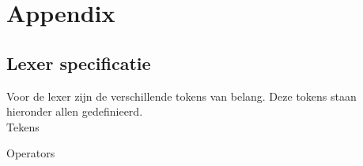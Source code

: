 \chapter{Appendix}
\section{Lexer specificatie}
Voor de lexer zijn de verschillende tokens van belang. Deze tokens staan hieronder allen gedefinieerd. \\ 

Tekens
\begin{description}
    \item {}    
    \item {}      \tab{:}
    \item {}  \tab{;}
    \item {}     \tab{(} 
    \item {}     \tab{)} 
    \item {}     \tab{[}
    \item {}     \tab{]}
    \item {}     \tab{\{}
    \item {}     \tab{\}}
    \item {}      \tab{,}
    \item {} 
    \item {} \tab{\textbackslash}
    \item {}       
\end{description}

\clearpage

Operators
\begin{description}
    \item {}    
    \item {}       \tab{+}
    \item {}      \tab{-}
    \item {}    \tab{/}
    \item {}    \tab{*}
    \item {}      \tab{\^}
    \item {}         \tab{\textless}
    \item {}         \tab{\textgreater}
    \item {}        \tab{\textgreater =}
    \item {}        \tab{\textless =}
    \item {}         \tab{=}
    \item {}        \tab{!}
    \item {}     \tab{==}
    \item {}         \tab{\textbar \textbar}
    \item {}        \tab{\&\&}
\end{description}

